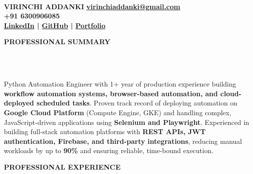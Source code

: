 \documentclass[a4paper,10pt]{article}
\newcommand{\lsep}{-0.5cm}
\newcommand{\resheading}[1]{{\small \colorbox{mygrey}{\begin{minipage}{0.975\textwidth}{\textbf{#1}}\end{minipage}}}}
\begin{document}
\hspace{0.5cm}\\[-1.8cm]

\textbf{VIRINCHI ADDANKI} \hspace{8.0cm} {\bf \href{mailto:virinchiaddanki@gmail.com}{virinchiaddanki@gmail.com}}\\
 \hspace{6.7cm} {\bf +91 6300906085} \\
 \hspace{8.9cm}
{\bf \href{https://www.linkedin.com/in/virinchi-addanki/}{LinkedIn} | \href{https://github.com/addanki-virinchi}{GitHub} | \href{https://virinchi-addanki.onrender.com/}{Portfolio}}\\

\vspace{-2mm}

\resheading{\textbf{PROFESSIONAL SUMMARY}}\\[\lsep]\\

\hspace{0.11cm}
\begin{minipage}{0.98\textwidth}
Python Automation Engineer with 1+ year of production experience building
\textbf{workflow automation systems, browser-based automation, and cloud-deployed
scheduled tasks}.
Proven track record of deploying automation on \textbf{Google Cloud Platform}
(Compute Engine, GKE) and handling complex, JavaScript-driven applications using
\textbf{Selenium and Playwright}.
Experienced in building full-stack automation platforms with
\textbf{REST APIs, JWT authentication, Firebase, and third-party integrations},
reducing manual workloads by up to \textbf{90\%} and ensuring reliable,
time-bound execution.
\end{minipage}

\vspace{4mm}

\resheading{\textbf{PROFESSIONAL EXPERIENCE}}
\end{document}
